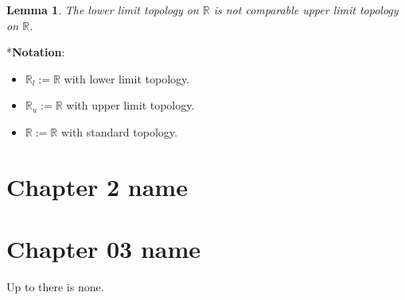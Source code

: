 \documentclass[
]{book}
\providecommand{\tightlist}{%
  \setlength{\itemsep}{0pt}\setlength{\parskip}{0pt}}
\newtheorem{lemma}{Lemma}[chapter]
\theoremstyle{definition}
\theoremstyle{definition}
\theoremstyle{definition}
\theoremstyle{definition}
\theoremstyle{remark}
\begin{document}
\begin{lemma}
\protect\hypertarget{lem:unnamed-chunk-33}{}\label{lem:unnamed-chunk-33}The lower limit topology on \(\mathbb{R}\) is not comparable upper limit topology on \(\mathbb{R}\).
\end{lemma}

*\textbf{Notation}:

\begin{itemize}
\tightlist
\item
  \(\mathbb{R}_l:=\mathbb{R}\) with lower limit topology.
\item
  \(\mathbb{R}_u:=\mathbb{R}\) with upper limit topology.
\item
  \(\mathbb{R}:=\mathbb{R}\) with standard topology.
\end{itemize}

\hypertarget{chapter-2-name}{%
\chapter{Chapter 2 name}\label{chapter-2-name}}

\hypertarget{chapter-03-name}{%
\chapter{Chapter 03 name}\label{chapter-03-name}}

Up to there is none.

  
\end{document}
